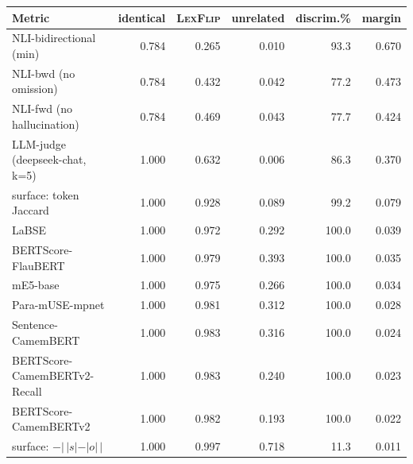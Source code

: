 \setlength{\tabcolsep}{4pt}
\begin{tabular}{lrrrrr}
\toprule
Metric & identical & \textsc{LexFlip} & unrelated & discrim.\% & margin \\
\midrule
NLI-bidirectional (min) & 0.784 & 0.265 & 0.010 & 93.3 & 0.670 \\
NLI-bwd (no omission) & 0.784 & 0.432 & 0.042 & 77.2 & 0.473 \\
NLI-fwd (no hallucination) & 0.784 & 0.469 & 0.043 & 77.7 & 0.424 \\
LLM-judge (deepseek-chat, k=5) & 1.000 & 0.632 & 0.006 & 86.3 & 0.370 \\
surface: token Jaccard & 1.000 & 0.928 & 0.089 & 99.2 & 0.079 \\
LaBSE & 1.000 & 0.972 & 0.292 & 100.0 & 0.039 \\
BERTScore-FlauBERT & 1.000 & 0.979 & 0.393 & 100.0 & 0.035 \\
mE5-base & 1.000 & 0.975 & 0.266 & 100.0 & 0.034 \\
Para-mUSE-mpnet & 1.000 & 0.981 & 0.312 & 100.0 & 0.028 \\
Sentence-CamemBERT & 1.000 & 0.983 & 0.316 & 100.0 & 0.024 \\
BERTScore-CamemBERTv2-Recall & 1.000 & 0.983 & 0.240 & 100.0 & 0.023 \\
BERTScore-CamemBERTv2 & 1.000 & 0.982 & 0.193 & 100.0 & 0.022 \\
surface: $-|\,|s|-|o|\,|$ & 1.000 & 0.997 & 0.718 & 11.3 & 0.011 \\
\bottomrule
\end{tabular}